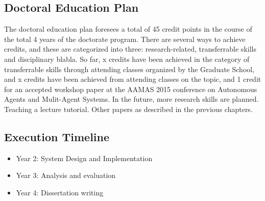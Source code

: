 \subsection{Doctoral Education Plan}
The doctoral education plan foresees a total of 45 credit points in the course of the total 4 years of the doctorate program. There are several ways to achieve credits, and these are categorized into three: research-related, transferrable skills and disciplinary blabla. So far, x credits have been achieved in the category of transferrable skills through attending classes organized by the Graduate School, and x credits have been achieved from attending classes on the topic, and 1 credit for an accepted workshop paper at the AAMAS 2015 conference on Autonomous Agents and Mulit-Agent Systems.
In the future, more research skills are planned.
Teaching a lecture tutorial.
Other papers as described in the previous chapters.

  
\subsection{Execution Timeline}  
\begin{itemize}
\item Year 2: System Design and Implementation
\item Year 3: Analysis and evaluation
\item Year 4: Dissertation writing
\end{itemize}
  
  
  
  